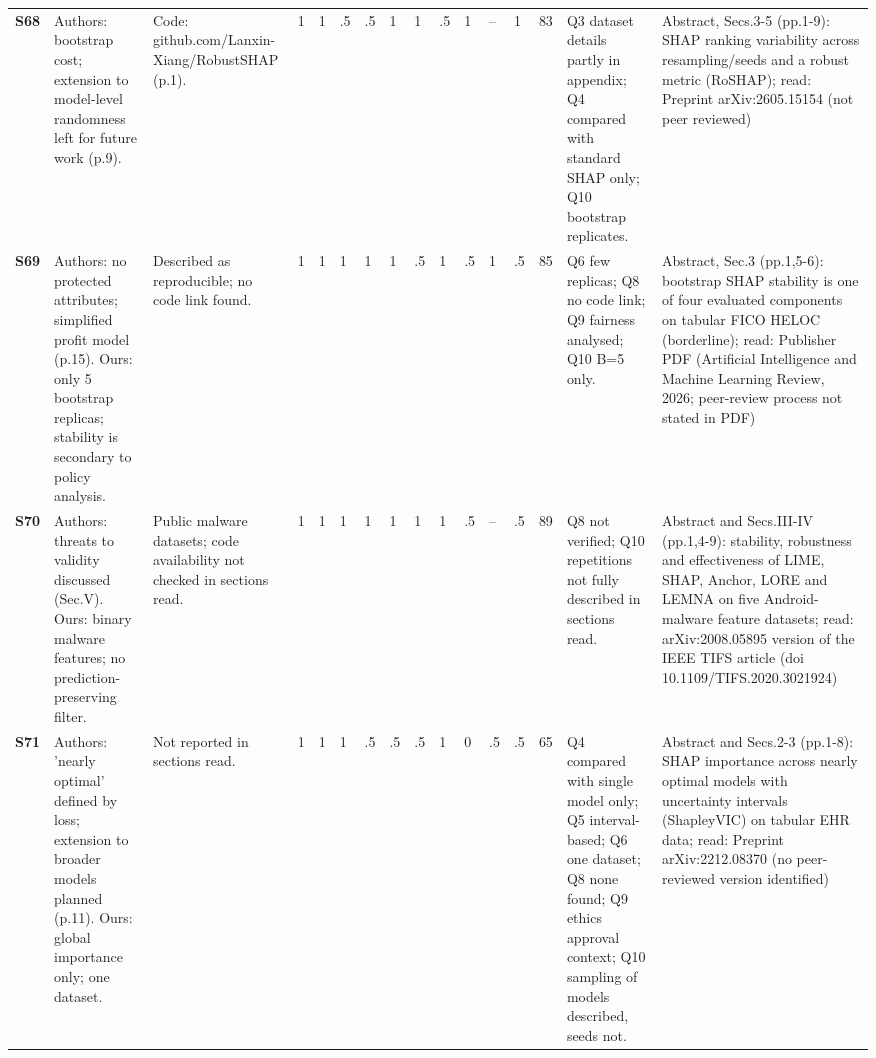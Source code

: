 \begin{longtable}{@{}P{1.0cm}P{4.6cm}P{3.6cm}P{0.3cm}P{0.3cm}P{0.3cm}P{0.3cm}P{0.3cm}P{0.3cm}P{0.3cm}P{0.3cm}P{0.3cm}P{0.36cm}P{0.75cm}P{3.0cm}P{3.9cm}@{}}
\textbf{S68} & Authors: bootstrap cost; extension to model-level randomness left for future work (p.9). & Code: github.com/\allowbreak{}Lanxin-Xiang/\allowbreak{}RobustSHAP (p.1). & 1 & 1 & .5 & .5 & 1 & 1 & .5 & 1 & -- & 1 & 83 & Q3 dataset details partly in appendix; Q4 compared with standard SHAP only; Q10 bootstrap replicates. & Abstract, Secs.3-5 (pp.1-9): SHAP ranking variability across resampling/\allowbreak{}seeds and a robust metric (RoSHAP); read: Preprint arXiv:2605.15154 (not peer reviewed) \\
\textbf{S69} & Authors: no protected attributes; simplified profit model (p.15). Ours: only 5 bootstrap replicas; stability is secondary to policy analysis. & Described as reproducible; no code link found. & 1 & 1 & 1 & 1 & 1 & .5 & 1 & .5 & 1 & .5 & 85 & Q6 few replicas; Q8 no code link; Q9 fairness analysed; Q10 B=5 only. & Abstract, Sec.3 (pp.1,5-6): bootstrap SHAP stability is one of four evaluated components on tabular FICO HELOC (borderline); read: Publisher PDF (Artificial Intelligence and Machine Learning Review, 2026; peer-review process not stated in PDF) \\
\textbf{S70} & Authors: threats to validity discussed (Sec.V). Ours: binary malware features; no prediction-preserving filter. & Public malware datasets; code availability not checked in sections read. & 1 & 1 & 1 & 1 & 1 & 1 & 1 & .5 & -- & .5 & 89 & Q8 not verified; Q10 repetitions not fully described in sections read. & Abstract and Secs.III-IV (pp.1,4-9): stability, robustness and effectiveness of LIME, SHAP, Anchor, LORE and LEMNA on five Android-malware feature datasets; read: arXiv:2008.05895 version of the IEEE TIFS article (doi 10.1109/\allowbreak{}TIFS.2020.3021924) \\
\textbf{S71} & Authors: 'nearly optimal' defined by loss; extension to broader models planned (p.11). Ours: global importance only; one dataset. & Not reported in sections read. & 1 & 1 & 1 & .5 & .5 & .5 & 1 & 0 & .5 & .5 & 65 & Q4 compared with single model only; Q5 interval-based; Q6 one dataset; Q8 none found; Q9 ethics approval context; Q10 sampling of models described, seeds not. & Abstract and Secs.2-3 (pp.1-8): SHAP importance across nearly optimal models with uncertainty intervals (ShapleyVIC) on tabular EHR data; read: Preprint arXiv:2212.08370 (no peer-reviewed version identified) \\

\end{longtable}

